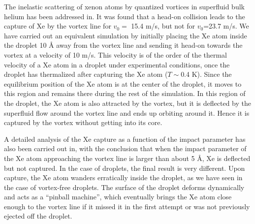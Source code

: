 
 The inelastic scattering of xenon atoms by quantized vortices in superfluid bulk helium has been addressed in.
  It was found that
  a head-on collision leads to the capture of Xe by the vortex line for $v_0=$ 15.4 m/s, but not  for $v_0$=23.7 m/s.
We have carried out  an equivalent  simulation by initially placing
 the Xe atom  inside the droplet 10 \AA{} away
from the vortex line and   sending it  head-on towards the vortex at a velocity of 10 m/s.
This velocity  is of the order of the thermal velocity of a Xe atom in a droplet under experimental conditions,
once the droplet has thermalized after capturing the Xe atom  ($T \sim$0.4 K)\citep{Toe04}. 
Since the equilibrium position of  the Xe atom is at the center of the droplet, it  moves to this region and remains there during the rest of the simulation.
In this region of the droplet, the Xe atom is also attracted by the vortex, but it is deflected by the superfluid flow around the vortex line and ends up orbiting around it.
 Hence it is captured by the vortex without getting into its  core.

A detailed  analysis of the Xe capture as a function of the impact parameter has also been  carried out in, with the conclusion that when the impact parameter 
 of the Xe atom approaching the vortex line is larger than about 5 \AA{}, Xe is deflected but not captured\citep{Psh16}.
  In the case of droplets, the final result is very different.
Upon capture, the Xe atom wanders erratically inside the droplet,  as we have seen in the case of vortex-free droplets.
 The surface of the droplet deforms dynamically and acts as
 a ``pinball machine'',  which  eventually brings the Xe atom close enough to the vortex line if it missed it
 in the first attempt or was not previously ejected off the droplet. 

